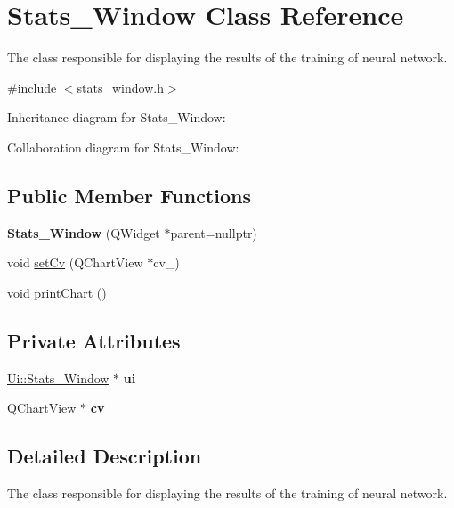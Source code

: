 \hypertarget{classStats__Window}{}\section{Stats\+\_\+\+Window Class Reference}
\label{classStats__Window}


The class responsible for displaying the results of the training of neural network.  




{\ttfamily \#include $<$stats\+\_\+window.\+h$>$}



Inheritance diagram for Stats\+\_\+\+Window\+:


Collaboration diagram for Stats\+\_\+\+Window\+:
\subsection*{Public Member Functions}
\begin{DoxyCompactItemize}
\item 
\mbox{\label{classStats__Window_a49651757f1c1248f77379112365e8e25}} 
{\bfseries Stats\+\_\+\+Window} (Q\+Widget $\ast$parent=nullptr)
\item 
void \hyperlink{classStats__Window_aa08614ebaf747b305a39bb790d2a96bd}{set\+Cv} (Q\+Chart\+View $\ast$cv\+\_\+)
\item 
void \hyperlink{classStats__Window_a1bdd2d19e64d9c316754e3f667ebbecb}{print\+Chart} ()
\end{DoxyCompactItemize}
\subsection*{Private Attributes}
\begin{DoxyCompactItemize}
\item 
\mbox{\label{classStats__Window_accb4cf095537cc89ba483a6122eda2c3}} 
\hyperlink{classUi_1_1Stats__Window}{Ui\+::\+Stats\+\_\+\+Window} $\ast$ {\bfseries ui}
\item 
\mbox{\label{classStats__Window_a0ca677bc8512151b105d24de3b9ea1ce}} 
Q\+Chart\+View $\ast$ {\bfseries cv}
\end{DoxyCompactItemize}


\subsection{Detailed Description}
The class responsible for displaying the results of the training of neural network. 



